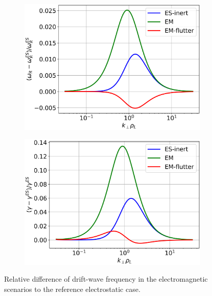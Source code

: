 \begin{figure}[H]
	\centering
	\begin{subfigure}[t]{0.45\textwidth}
		\centering
		\includegraphics[width=1\textwidth]{schemes/comparison_DW_real.png}
		\label{fig:edge_comparisonDWreal}
	\end{subfigure}
	\begin{subfigure}[t]{0.45\textwidth}
		\centering
		\includegraphics[width=1\textwidth]{schemes/comparison_DW_imag.png}
		\label{fig:edge_comparisonDWimag}
	\end{subfigure}
	\caption{Relative difference of drift-wave frequency in the electromagnetic scenarios to the reference electrostatic case.} 
	\label{fig:edge_comparisonDW}
\end{figure}

